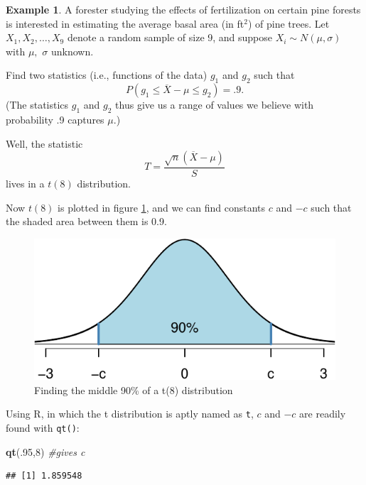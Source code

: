 \documentclass[
]{book}
\newenvironment{Shaded}{\begin{snugshade}}{\end{snugshade}}
\newcommand{\CommentTok}[1]{\textcolor[rgb]{0.56,0.35,0.01}{\textit{#1}}}
\newcommand{\DecValTok}[1]{\textcolor[rgb]{0.00,0.00,0.81}{#1}}
\newcommand{\FunctionTok}[1]{\textcolor[rgb]{0.13,0.29,0.53}{\textbf{#1}}}
\newcommand{\NormalTok}[1]{#1}
\theoremstyle{definition}
\theoremstyle{definition}
\newtheorem{example}{Example}[chapter]
\theoremstyle{definition}
\theoremstyle{definition}
\theoremstyle{remark}
\begin{document}
\begin{example}
\protect\hypertarget{exm:t-distribution-practice}{}\label{exm:t-distribution-practice}A forester studying the effects of fertilization on certain pine forests is interested in estimating the average basal area (in ft\(^2\)) of pine trees.
Let \(X_1, X_2, \ldots, X_9\) denote a random sample of size 9, and suppose \(X_i \sim N(\mu,\sigma)\) with \(\mu,\) \(\sigma\) unknown.

Find two statistics (i.e., functions of the data) \(g_1\) and \(g_2\) such that \[P(g_1 \leq \overline{X}-\mu \leq g_2) = .9.\]
(The statistics \(g_1\) and \(g_2\) thus give us a range of values we believe with probability .9 captures \(\mu\).)

Well, the statistic \[T = \frac{\sqrt{n}(\overline{X}-\mu)}{S}\] lives in a \(t(8)\) distribution.

Now \(t(8)\) is plotted in figure \ref{fig:t8}, and we can find constants \(c\) and \(-c\) such that the shaded area between them is 0.9.

\begin{figure}
\centering
\includegraphics{math340-notes_files/figure-latex/t8-1.pdf}
\caption{\label{fig:t8}Finding the middle 90\% of a t(8) distribution}
\end{figure}

Using R, in which the t distribution is aptly named as \texttt{t}, \(c\) and \(-c\) are readily found with \texttt{qt()}:

\begin{Shaded}
\begin{Highlighting}[]
\FunctionTok{qt}\NormalTok{(.}\DecValTok{95}\NormalTok{,}\DecValTok{8}\NormalTok{) }\CommentTok{\#gives c}
\end{Highlighting}
\end{Shaded}

\begin{verbatim}
## [1] 1.859548
\end{verbatim}


\end{example}
\end{document}
